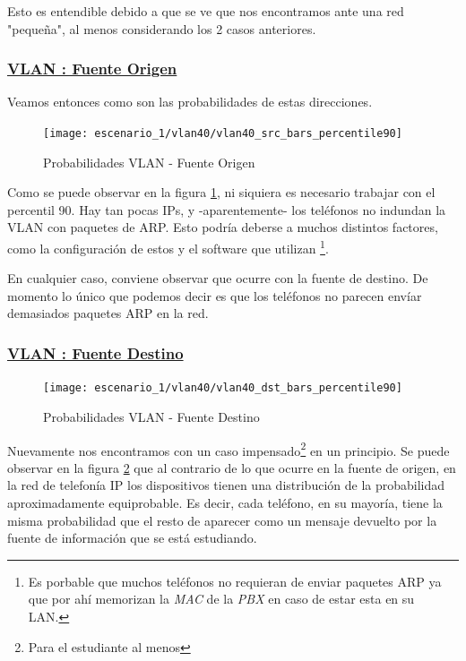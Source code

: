 \par Esto es entendible debido a que se ve que nos encontramos ante una red "peque\~na",
al menos considerando los 2 casos anteriores.


\subsubsection*{\underline{VLAN : Fuente Origen}}\label{subsubsec:vlan40_src}
\par Veamos entonces como son las probabilidades de estas direcciones.

\begin{figure}[!ht]
    \centering
    \texttt{[image: escenario\_1/vlan40/vlan40\_src\_bars\_percentile90]}
    \caption{Probabilidades VLAN  - Fuente Origen}
    \label{fig:vlan40_src_prob_per90}
\end{figure}

\par Como se puede observar en la figura \ref{fig:vlan40_src_prob_per90}, ni siquiera
es necesario trabajar con el percentil 90. Hay tan pocas IPs, y -aparentemente- los
tel\'efonos no indundan la VLAN con paquetes de ARP. Esto podr\'ia deberse a muchos
distintos factores, como la configuraci\'on de estos y el software que utilizan%
\footnote{Es porbable que muchos tel\'efonos no requieran de enviar paquetes ARP ya
que por ah\'i memorizan la \textit{MAC} de la \textit{PBX} en caso de estar esta
en su LAN.}.

\par En cualquier caso, conviene observar que ocurre con la fuente de destino.
De momento lo \'unico que podemos decir es que los tel\'efonos no parecen
env\'iar demasiados paquetes ARP en la red.


\subsubsection*{\underline{VLAN : Fuente Destino}}\label{subsubsec:vlan40_dst}

\begin{figure}[!ht]
    \centering
    \texttt{[image: escenario\_1/vlan40/vlan40\_dst\_bars\_percentile90]}
    \caption{Probabilidades VLAN  - Fuente Destino}
    \label{fig:vlan40_dst_prob_per90}
\end{figure}

\par Nuevamente nos encontramos con un caso impensado\footnote{Para el estudiante al menos}
en un principio. Se puede observar en la figura \ref{fig:vlan40_dst_prob_per90} que al
contrario de lo que ocurre  en la fuente de origen, en la red de telefon\'ia IP los dispositivos
tienen una distribuci\'on de la probabilidad aproximadamente equiprobable. Es decir, cada
tel\'efono, en su mayor\'ia, tiene la misma probabilidad que el resto de aparecer como
un mensaje devuelto por la fuente de informaci\'on que se est\'a estudiando.

